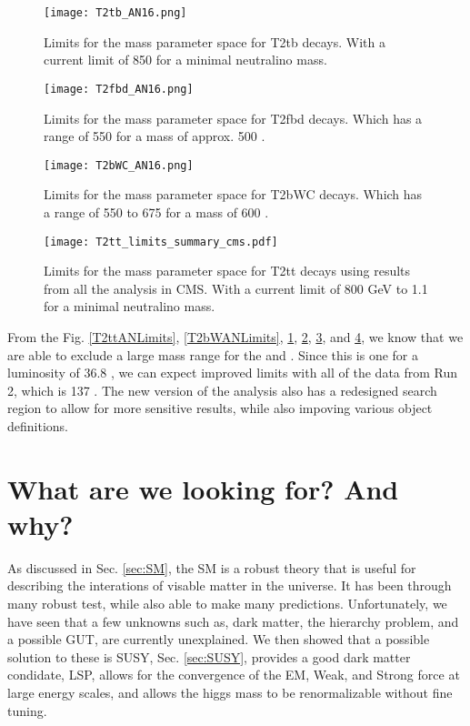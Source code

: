 \begin{figure}
\centering
	\texttt{[image: T2tb\_AN16.png]}
 	\caption[T2tb Limits]{Limits for the mass parameter space for T2tb decays. With a current limit of 850 \GeV{} for a minimal neutralino mass.}
 	\label{T2tbANLimits} 
\end{figure}

\begin{figure}
\centering
	\texttt{[image: T2fbd\_AN16.png]}
 	\caption[T2fbd Limits]{Limits for the mass parameter space for T2fbd decays. Which has a range of 550 \GeV{} for a \neutralino{} mass of approx. 500 \GeV.}
 	\label{T2fbdANLimits} 
\end{figure}

\begin{figure}
\centering
	\texttt{[image: T2bWC\_AN16.png]}
 	\caption[T2bWC Limits]{Limits for the mass parameter space for T2bWC decays. Which has a range of 550 to 675 \GeV{} for a \neutralino{} mass of 600 \GeV.}
 	\label{T2bWCANLimits} 
\end{figure}

\begin{figure}
\centering
	\texttt{[image: T2tt\_limits\_summary\_cms.pdf]}
 	\caption[T2tt Limits for all decay modes]{Limits for the mass parameter space for T2tt decays using results from all the analysis in CMS. With a current limit of 800 GeV to 1.1 \TeV{} for a minimal neutralino mass.}
 	\label{T2ttCMSAll} 
\end{figure}

From the Fig. \ref{T2ttANLimits}, \ref{T2bWANLimits}, \ref{T2tbANLimits}, \ref{T2fbdANLimits}, \ref{T2bWCANLimits}, and \ref{T2ttCMSAll}, we know that we are able to exclude a large mass range for the \st{} and \neutralino{}. Since this is one for a luminosity of 36.8 \fb, we can expect improved limits with all of the data from Run 2, which is 137 \fb. The new version of the analysis also has a redesigned search region to allow for more sensitive results, while also impoving various object definitions.

\section{What are we looking for? And why?}
As discussed in Sec. \ref{sec:SM}, the SM is a robust theory that is useful for describing the interations of visable matter in the universe. It has been through many robust test, while also able to make many predictions. Unfortunately, we have seen that a few unknowns such as, dark matter, the hierarchy problem, and a possible GUT, are currently unexplained. We then showed that a possible solution to these is SUSY, Sec. \ref{sec:SUSY}, provides a good dark matter condidate, LSP, allows for the convergence of the EM, Weak, and Strong force at large energy scales, and allows the higgs mass to be renormalizable without fine tuning. 


